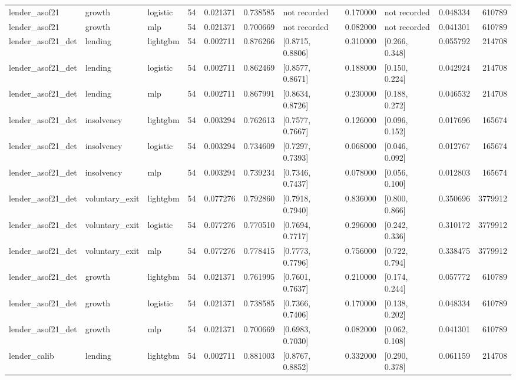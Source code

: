 \begin{table}
{\begin{tabular}{lllrrrlrlrr}
lender_asof21 & growth & logistic & 54 & 0.021371 & 0.738585 & not recorded & 0.170000 & not recorded & 0.048334 & 610789 \\
lender_asof21 & growth & mlp & 54 & 0.021371 & 0.700669 & not recorded & 0.082000 & not recorded & 0.041301 & 610789 \\
lender_asof21_det & lending & lightgbm & 54 & 0.002711 & 0.876266 & [0.8715, 0.8806] & 0.310000 & [0.266, 0.348] & 0.055792 & 214708 \\
lender_asof21_det & lending & logistic & 54 & 0.002711 & 0.862469 & [0.8577, 0.8671] & 0.188000 & [0.150, 0.224] & 0.042924 & 214708 \\
lender_asof21_det & lending & mlp & 54 & 0.002711 & 0.867991 & [0.8634, 0.8726] & 0.230000 & [0.188, 0.272] & 0.046532 & 214708 \\
lender_asof21_det & insolvency & lightgbm & 54 & 0.003294 & 0.762613 & [0.7577, 0.7667] & 0.126000 & [0.096, 0.152] & 0.017696 & 165674 \\
lender_asof21_det & insolvency & logistic & 54 & 0.003294 & 0.734609 & [0.7297, 0.7393] & 0.068000 & [0.046, 0.092] & 0.012767 & 165674 \\
lender_asof21_det & insolvency & mlp & 54 & 0.003294 & 0.739234 & [0.7346, 0.7437] & 0.078000 & [0.056, 0.100] & 0.012803 & 165674 \\
lender_asof21_det & voluntary_exit & lightgbm & 54 & 0.077276 & 0.792860 & [0.7918, 0.7940] & 0.836000 & [0.800, 0.866] & 0.350696 & 3779912 \\
lender_asof21_det & voluntary_exit & logistic & 54 & 0.077276 & 0.770510 & [0.7694, 0.7717] & 0.296000 & [0.242, 0.336] & 0.310172 & 3779912 \\
lender_asof21_det & voluntary_exit & mlp & 54 & 0.077276 & 0.778415 & [0.7773, 0.7796] & 0.756000 & [0.722, 0.794] & 0.338475 & 3779912 \\
lender_asof21_det & growth & lightgbm & 54 & 0.021371 & 0.761995 & [0.7601, 0.7637] & 0.210000 & [0.174, 0.244] & 0.057772 & 610789 \\
lender_asof21_det & growth & logistic & 54 & 0.021371 & 0.738585 & [0.7366, 0.7406] & 0.170000 & [0.138, 0.202] & 0.048334 & 610789 \\
lender_asof21_det & growth & mlp & 54 & 0.021371 & 0.700669 & [0.6983, 0.7030] & 0.082000 & [0.062, 0.108] & 0.041301 & 610789 \\
lender_calib & lending & lightgbm & 54 & 0.002711 & 0.881003 & [0.8767, 0.8852] & 0.332000 & [0.290, 0.378] & 0.061159 & 214708 \\

\end{tabular}}
\end{table}
